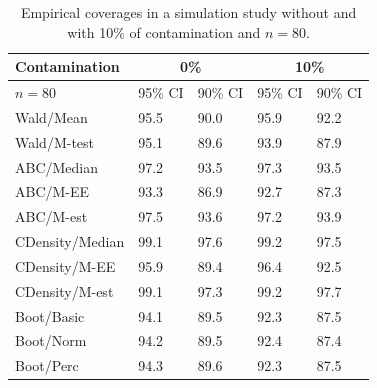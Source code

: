 \documentclass[preprint,12pt,authoryear]{elsarticle}
\newcommand{\bb}{\textcolor{blue}}
\begin{document}
\begin{table}[h!]
\centering
\begin{tabular}{|l|l|l|l|l|} \hline%
Contamination &\multicolumn{2}{c|}{0\%} & \multicolumn{2}{c|}{10\%}   \\  \hline
 $n=80$  & 95\% CI   &  90\%  CI &     95\% CI   &  90\%  CI  \\ \hline %
Wald/Mean&  95.5&90.0& 95.9  &  92.2  \\
Wald/M-test &95.1&89.6& 93.9   &  87.9  \\
ABC/Median&97.2 &  93.5  &   97.3       &93.5     \\
ABC/M-EE &93.3&86.9 &      92.7    &   87.3 \\
ABC/M-est  &97.5  &93.6&    97.2     &   93.9       \\
CDensity/Median & 99.1 &97.6 &  99.2   & 97.5  \\
CDensity/M-EE &95.9&89.4&    96.4   & 92.5    \\
CDensity/M-est& 99.1&97.3&     99.2    & 97.7        \\
Boot/Basic &94.1 &89.5& 92.3& 87.5\\
Boot/Norm & 94.2&89.5& 92.4&87.4\\
Boot/Perc &94.3 &89.6&92.3&87.5\\
 \hline
\end{tabular}
\caption{Empirical coverages in a simulation study  without and with
10\% of contamination and $n=80$. }
\label{sim_80}
\end{table}
 
\end{document}
